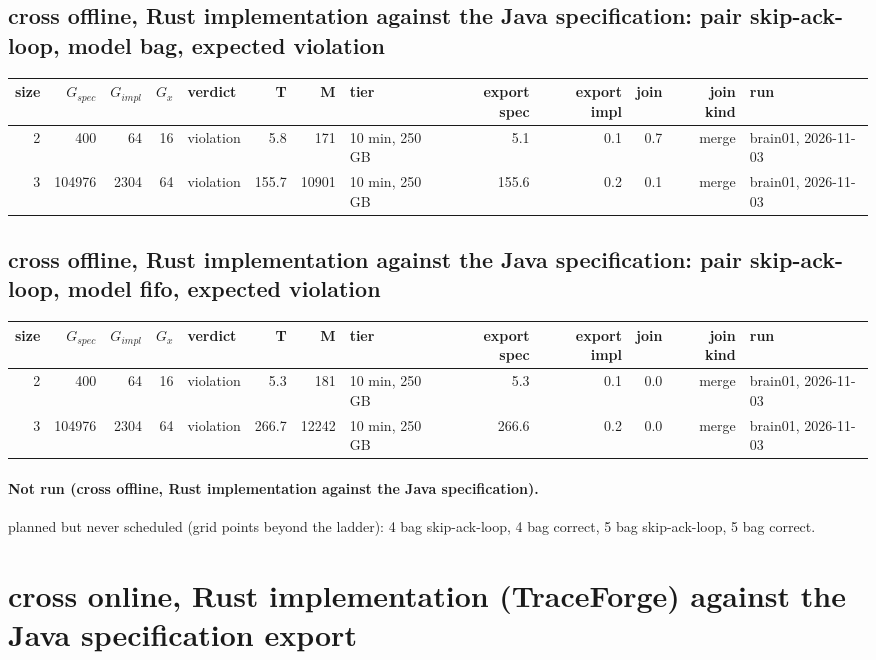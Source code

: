 \documentclass[10pt]{article}
\begin{document}
\subsection*{cross offline, Rust implementation against the Java specification: pair \textsf{skip-ack-loop}, model bag, expected violation}
\begin{longtable}{@{}rrrrlrrlrrrrl@{}}
\toprule
size & $G_{\mathit{spec}}$ & $G_{\mathit{impl}}$ & $G_x$ & verdict & T & M & tier & export spec & export impl & join & join kind & run \\
\midrule
\endhead
\color{blue} 2 & 400 & 64 & 16 & violation & 5.8 & 171 & 10 min, 250 GB & 5.1 & 0.1 & 0.7 & merge & brain01, 2026-11-03 \\
\color{blue} 3 & 104976 & 2304 & 64 & violation & 155.7 & 10901 & 10 min, 250 GB & 155.6 & 0.2 & 0.1 & merge & brain01, 2026-11-03 \\
\bottomrule
\end{longtable}
\subsection*{cross offline, Rust implementation against the Java specification: pair \textsf{skip-ack-loop}, model fifo, expected violation}
\begin{longtable}{@{}rrrrlrrlrrrrl@{}}
\toprule
size & $G_{\mathit{spec}}$ & $G_{\mathit{impl}}$ & $G_x$ & verdict & T & M & tier & export spec & export impl & join & join kind & run \\
\midrule
\endhead
\color{blue} 2 & 400 & 64 & 16 & violation & 5.3 & 181 & 10 min, 250 GB & 5.3 & 0.1 & 0.0 & merge & brain01, 2026-11-03 \\
\color{blue} 3 & 104976 & 2304 & 64 & violation & 266.7 & 12242 & 10 min, 250 GB & 266.6 & 0.2 & 0.0 & merge & brain01, 2026-11-03 \\
\bottomrule
\end{longtable}
\paragraph{Not run (cross offline, Rust implementation against the Java specification).}
planned but never scheduled (grid points beyond the ladder): 4 bag skip-ack-loop, 4 bag correct, 5 bag skip-ack-loop, 5 bag correct.\par
\section*{cross online, Rust implementation (TraceForge) against the Java specification export}
\end{document}
